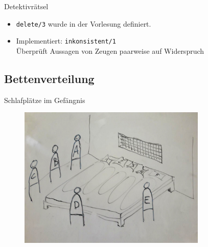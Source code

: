 \documentclass{beamer}
\begin{document}
\begin{frame}{Detektivrätsel}
	
	\begin{itemize}
            \item \texttt{delete/3} wurde in der Vorlesung definiert.
            \item Implementiert: \texttt{inkonsistent/1}\\
                  Überprüft Aussagen von Zeugen paarweise auf Widerspruch
	\end{itemize}
\end{frame}


\subsection{Bettenverteilung}

\begin{frame}{Schlafplätze im Gefängnis}
	\begin{figure}
		\includegraphics[width=0.8\textwidth]{images/bett}
	\end{figure}
\end{frame}
\end{document}
